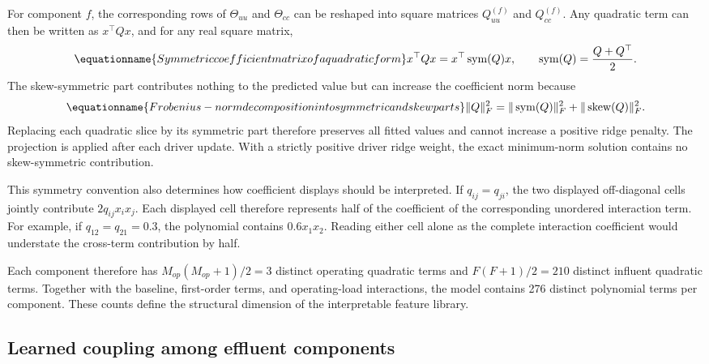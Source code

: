 For component \(f\), the corresponding rows of \(\Theta_{uu}\) and \(\Theta_{cc}\) can be reshaped into square matrices \(Q_{uu}^{(f)}\) and \(Q_{cc}^{(f)}\). Any quadratic term can then be written as \(x^\top Qx\), and for any real square matrix,
\begin{equation}
\equationname{Symmetric coefficient matrix of a quadratic form}
\label{eq:icsor_quadratic_symmetry}
x^\top Qx=x^\top\operatorname{sym}(Q)x,
\qquad
\operatorname{sym}(Q)=\frac{Q+Q^\top}{2}.
\end{equation}
The skew-symmetric part contributes nothing to the predicted value but can increase the coefficient norm because
\begin{equation}
\equationname{Frobenius-norm decomposition into symmetric and skew parts}
\label{eq:icsor_quadratic_norm}
\|Q\|_F^2=
\|\operatorname{sym}(Q)\|_F^2+
\|\operatorname{skew}(Q)\|_F^2.
\end{equation}
Replacing each quadratic slice by its symmetric part therefore preserves all fitted values and cannot increase a positive ridge penalty. The projection is applied after each driver update. With a strictly positive driver ridge weight, the exact minimum-norm solution contains no skew-symmetric contribution.

This symmetry convention also determines how coefficient displays should be interpreted. If \(q_{ij}=q_{ji}\), the two displayed off-diagonal cells jointly contribute \(2q_{ij}x_i x_j\). Each displayed cell therefore represents half of the coefficient of the corresponding unordered interaction term. For example, if \(q_{12}=q_{21}=0.3\), the polynomial contains \(0.6x_1x_2\). Reading either cell alone as the complete interaction coefficient would understate the cross-term contribution by half.

Each component therefore has \(M_{op}(M_{op}+1)/2=3\) distinct operating quadratic terms and \(F(F+1)/2=210\) distinct influent quadratic terms. Together with the baseline, first-order terms, and operating-load interactions, the model contains 276 distinct polynomial terms per component. These counts define the structural dimension of the interpretable feature library.

\subsection{Learned coupling among effluent components}

